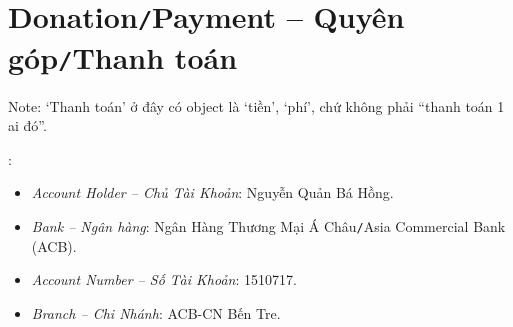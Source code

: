 \documentclass[12pt,twoside]{book}
\begin{document}
\section{Donation{\tt/}Payment -- Quyên góp{\tt/}Thanh toán}
Note: `Thanh toán' ở đây có object là `tiền', `phí', chứ không phải ``thanh toán 1 ai đó''.
\vspace{2mm}

:
\begin{itemize}
	\item {\it Account Holder -- Chủ Tài Khoản}: {\sc Nguyễn Quản Bá Hồng}.
	\item {\it Bank -- Ngân hàng}: Ngân Hàng Thương Mại Á Châu{\tt/}Asia Commercial Bank (ACB).
	\item {\it Account Number -- Số Tài Khoản}: 1510717.
	\item {\it Branch -- Chi Nhánh}: ACB-CN Bến Tre.
\end{itemize}


\printglossaries

\printbibliography[heading=bibintoc]
\label{ref}
	
\end{document}
